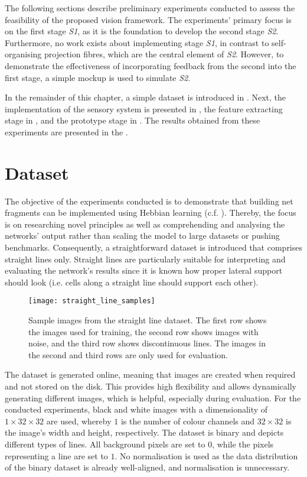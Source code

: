 The following sections describe preliminary experiments conducted to assess the feasibility of the proposed vision framework.
The experiments' primary focus is on the first stage \emph{S1}, as it is the foundation to develop the second stage \emph{S2}. Furthermore, no work exists about implementing stage \emph{S1}, in contrast to self-organising projection fibres, which are the central element of \emph{S2}.
However, to demonstrate the effectiveness of incorporating feedback from the second into the first stage, a simple mockup is used to simulate \emph{S2}.

In the remainder of this chapter, a simple dataset is introduced in . Next, the implementation of the sensory system is presented in , the feature extracting stage in , and the prototype stage in . The results obtained from these experiments are presented in the .


\section{Dataset}
The objective of the experiments conducted is to demonstrate that building net fragments can be implemented using Hebbian learning  (c.f. ).
Thereby, the focus is on researching novel principles as well as comprehending and analysing the networks' output rather than scaling the model to large datasets or pushing benchmarks.
Consequently, a straightforward dataset is introduced that comprises straight lines only.
Straight lines are particularly suitable for interpreting and evaluating the network's results since it is known how proper lateral support should look (i.e. cells along a straight line should support each other).


\begin{figure}[h]
    \centering
    \texttt{[image: straight\_line\_samples]}
    \caption[Sample images from the dataset]{Sample images from the straight line dataset. The first row shows the images used for training, the second row shows images with noise, and the third row shows discontinuous lines. The images in the second and third rows are only used for evaluation.}
\end{figure}


The dataset is generated online, meaning that images are created when required and not stored on the disk. This provides high flexibility and allows dynamically generating different images, which is helpful, especially during evaluation.
For the conducted experiments, black and white images with a dimensionality of $1 \times 32 \times 32$ are used, whereby $1$ is the number of colour channels and $32 \times 32$ is the image's width and height, respectively.
The dataset is binary and depicts different types of lines.
All background pixels are set to $0$, while the pixels representing a line are set to $1$.
No normalisation is used as the data distribution of the binary dataset is already well-aligned, and normalisation is unnecessary.

